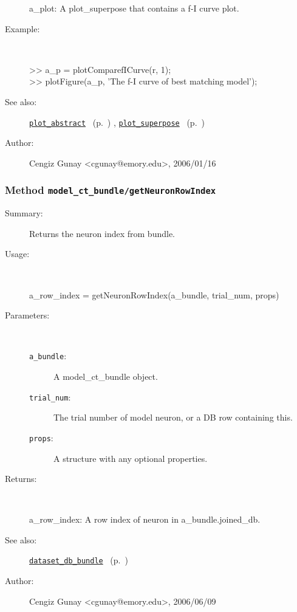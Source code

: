 \begin{description}
	a\_plot: A plot\_superpose that contains a f-I curve plot.
%
\item[Example:]~
\begin{lyxcode} >> a\_p = plotComparefICurve(r, 1);\\%
 >> plotFigure(a\_p, 'The f-I curve of best matching model');\\%
\end{lyxcode}
%
\item[See also:]%
\hyperlink{ref_plot_abstract}{\texttt{plot\_abstract}}%
\ (p.~\pageref{ref_plot_abstract})%
%
, \hyperlink{ref_plot_superpose}{\texttt{plot\_superpose}}%
\ (p.~\pageref{ref_plot_superpose})%
%
%
\item[Author:]%
Cengiz Gunay <cgunay@emory.edu>, 2006/01/16%
\end{description}
\methodline%
\subsubsection[Method \texttt{getNeuronRowIndex}]{Method \texttt{model\_ct\_bundle/getNeuronRowIndex}}%
%
\label{ref_model_ct_bundle__getNeuronRowIndex}%
\hypertarget{ref_model_ct_bundle__getNeuronRowIndex}{}%
\begin{description}
\item[Summary:]Returns the neuron index from bundle.
%
\item[Usage:]~%
\begin{lyxcode}%
a\_row\_index = getNeuronRowIndex(a\_bundle, trial\_num, props)
%
\end{lyxcode}%
%
%
\item[Parameters:]~
\begin{description}%
\item[\texttt{a\_bundle}:]
 A model\_ct\_bundle object.
\item[\texttt{trial\_num}:]
 The trial number of model neuron, or a DB row containing this.
\item[\texttt{props}:]
 A structure with any optional properties.
\end{description}%
%
\item[Returns:]~

	a\_row\_index: A row index of neuron in a\_bundle.joined\_db.
%
%
\item[See also:]%
\hyperlink{ref_dataset_db_bundle}{\texttt{dataset\_db\_bundle}}%
\ (p.~\pageref{ref_dataset_db_bundle})%
%
%
\item[Author:]%
Cengiz Gunay <cgunay@emory.edu>, 2006/06/09%
\end{description}
\methodline%
